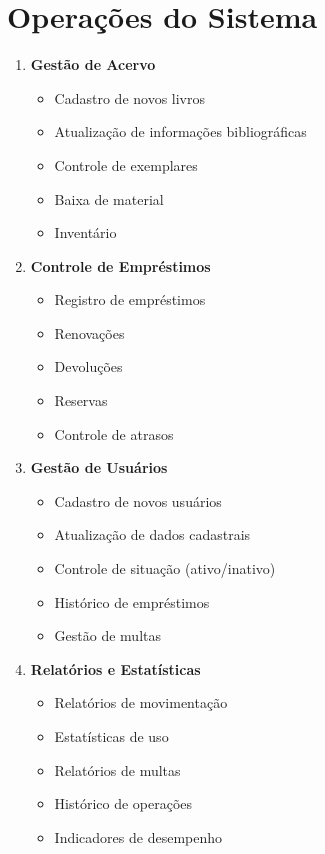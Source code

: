 \documentclass[12pt,a4paper]{article}
\begin{document}
\section{Operações do Sistema}

\begin{tcolorbox}[title=Operações Principais]
\begin{enumerate}[label=\textbf{OP\arabic*.}]
    \item \textbf{Gestão de Acervo}
    \begin{itemize}
        \item Cadastro de novos livros
        \item Atualização de informações bibliográficas
        \item Controle de exemplares
        \item Baixa de material
        \item Inventário
    \end{itemize}

    \item \textbf{Controle de Empréstimos}
    \begin{itemize}
        \item Registro de empréstimos
        \item Renovações
        \item Devoluções
        \item Reservas
        \item Controle de atrasos
    \end{itemize}

    \item \textbf{Gestão de Usuários}
    \begin{itemize}
        \item Cadastro de novos usuários
        \item Atualização de dados cadastrais
        \item Controle de situação (ativo/inativo)
        \item Histórico de empréstimos
        \item Gestão de multas
    \end{itemize}

    \item \textbf{Relatórios e Estatísticas}
    \begin{itemize}
        \item Relatórios de movimentação
        \item Estatísticas de uso
        \item Relatórios de multas
        \item Histórico de operações
        \item Indicadores de desempenho
    \end{itemize}


\end{enumerate}
\end{tcolorbox}
\end{document}
